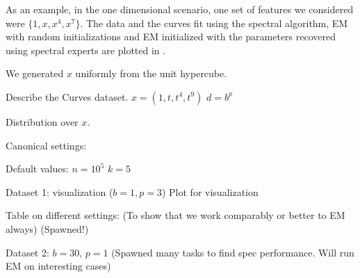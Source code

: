 \begin{figure}[t]
  \centering
  \label{fig:curves}
\end{figure}

As an example, in the one dimensional scenario, one set of features we
considered were $\{1, x, x^4, x^7\}$. The data and the curves fit using
the spectral algorithm, EM with random initializations and EM
initialized with the parameters recovered using spectral experts are
plotted in .

We generated $x$ uniformly from the unit hypercube.

Describe the Curves dataset.
$x = (1, t, t^4, t^9)$
$d = b^p$

Distribution over $x$.

Canonical settings:

Default values:
$n = 10^5$
$k = 5$

Dataset 1: visualization ($b = 1, p = 3$) 
Plot for visualization

Table on different settings: 
  (To show that we work comparably or better to EM always)
  (Spawned!)

Dataset 2: $b = 30$, $p = 1$
(Spawned many tasks to find spec performance. Will run EM on interesting cases)


